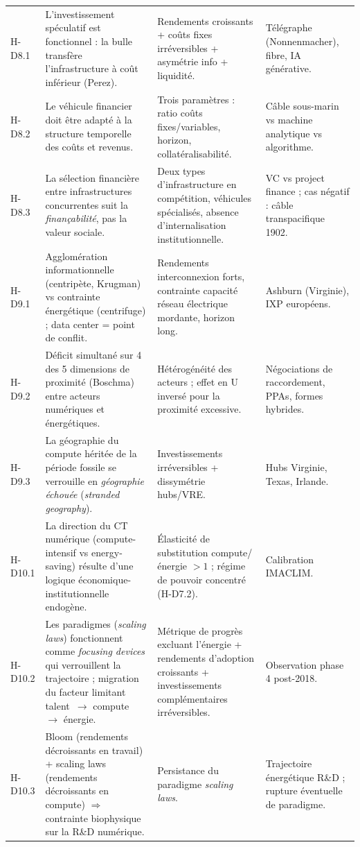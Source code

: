 \begin{landscape}
\begin{longtable}{p{1.6cm}p{6.5cm}p{6cm}p{4cm}}
\addlinespace
H-D8.1 & L'investissement spéculatif est fonctionnel : la bulle transfère l'infrastructure à coût inférieur (Perez). & Rendements croissants + coûts fixes irréversibles + asymétrie info + liquidité. & Télégraphe (Nonnenmacher), fibre, IA générative. \\
\addlinespace
H-D8.2 & Le véhicule financier doit être adapté à la structure temporelle des coûts et revenus. & Trois paramètres : ratio coûts fixes/variables, horizon, collatéralisabilité. & Câble sous-marin vs machine analytique vs algorithme. \\
\addlinespace
H-D8.3 & La sélection financière entre infrastructures concurrentes suit la \emph{finançabilité}, pas la valeur sociale. & Deux types d'infrastructure en compétition, véhicules spécialisés, absence d'internalisation institutionnelle. & VC vs project finance ; cas négatif : câble transpacifique 1902. \\
\addlinespace
H-D9.1 & Agglomération informationnelle (centripète, Krugman) vs contrainte énergétique (centrifuge) ; data center = point de conflit. & Rendements interconnexion forts, contrainte capacité réseau électrique mordante, horizon long. & Ashburn (Virginie), IXP européens. \\
\addlinespace
H-D9.2 & Déficit simultané sur 4 des 5 dimensions de proximité (Boschma) entre acteurs numériques et énergétiques. & Hétérogénéité des acteurs ; effet en U inversé pour la proximité excessive. & Négociations de raccordement, PPAs, formes hybrides. \\
\addlinespace
H-D9.3 & La géographie du compute héritée de la période fossile se verrouille en \emph{géographie échouée} (\emph{stranded geography}). & Investissements irréversibles + dissymétrie hubs/VRE. & Hubs Virginie, Texas, Irlande. \\
\addlinespace
H-D10.1 & La direction du CT numérique (compute-intensif vs energy-saving) résulte d'une logique économique-institutionnelle endogène. & Élasticité de substitution compute/énergie $> 1$ ; régime de pouvoir concentré (H-D7.2). & Calibration IMACLIM. \\
\addlinespace
H-D10.2 & Les paradigmes (\emph{scaling laws}) fonctionnent comme \emph{focusing devices} qui verrouillent la trajectoire ; migration du facteur limitant talent~$\to$ compute~$\to$ énergie. & Métrique de progrès excluant l'énergie + rendements d'adoption croissants + investissements complémentaires irréversibles. & Observation phase 4 post-2018. \\
\addlinespace
H-D10.3 & Bloom (rendements décroissants en travail) + scaling laws (rendements décroissants en compute) $\Rightarrow$ contrainte biophysique sur la R\&D numérique. & Persistance du paradigme \emph{scaling laws}. & Trajectoire énergétique R\&D ; rupture éventuelle de paradigme. \\

\end{longtable}
\end{landscape}
